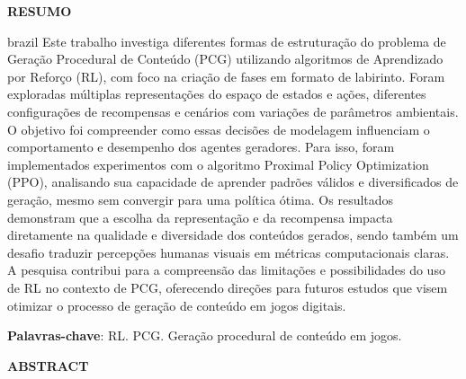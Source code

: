 \setlength{\absparsep}{18pt} %
\begin{center}
    \textbf{RESUMO}
\end{center}

\begin{otherlanguage*}{brazil}
    Este trabalho investiga diferentes formas de estruturação do problema de 
    Geração Procedural de Conteúdo (PCG) utilizando algoritmos de Aprendizado por 
    Reforço (RL), com foco na criação de fases em formato de labirinto. Foram 
    exploradas múltiplas representações do espaço de estados e ações, diferentes 
    configurações de recompensas e cenários com variações de parâmetros ambientais. 
    O objetivo foi compreender como essas decisões de modelagem influenciam o 
    comportamento e desempenho dos agentes geradores. Para isso, foram implementados 
    experimentos com o algoritmo Proximal Policy Optimization (PPO), analisando sua 
    capacidade de aprender padrões válidos e diversificados de geração, mesmo sem 
    convergir para uma política ótima. Os resultados demonstram que a escolha da 
    representação e da recompensa impacta diretamente na qualidade e diversidade dos 
    conteúdos gerados, sendo também um desafio traduzir percepções humanas visuais em 
    métricas computacionais claras. A pesquisa contribui para a compreensão das 
    limitações e possibilidades do uso de RL no contexto de PCG, oferecendo direções 
    para futuros estudos que visem otimizar o processo de geração de conteúdo em jogos 
    digitais.

    \textbf{Palavras-chave}: RL. PCG. Geração procedural de conteúdo em jogos.
\end{otherlanguage*}
\newpage
\begin{center}
    \textbf{ABSTRACT}
\end{center}
